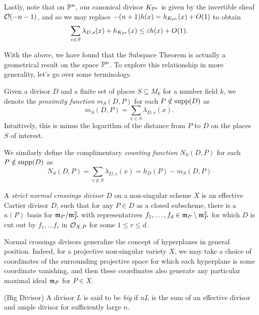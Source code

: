 Lastly, note that on $\mathbb{P}^n$,
our canonical divisor $K_{\mathbb{P}^n}$ is given by the invertible sheaf ${\mathcal{O}(-n - 1)}$, 
and so we may replace $-(n + 1)h(x) = h_{K_{\mathbb{P}^n}}(x) + O(1)$ to obtain
\[
    \sum_{v \in S} \lambda_{D,s}(x)
    + h_{K_{\mathbb{P}^n}}(x) \leq \varepsilon h(x) + O(1).
\]

With the above, 
we have found that the Subspace Theorem is actually a geometrical result on the space $\mathbb{P}^n$.
To explore this relationship in more generality,
let's go over some terminology.

\begin{definition}
    Given a divisor $D$ and a finite set of places $S \subseteq M_k$ for a number field $k$,
    we denote the \textit{proximity function} $m_S(D, P)$ for each $P \notin {\rm supp}(D)$ as
    \[
        m_S(D, P) = \sum_{v \in S} \lambda_{D,s}(x).
    \]
    Intuitively, this is minus the logarithm of the distance from $P$ to $D$ on the places $S$ of interest.

    We similarly define the complimentary \textit{counting function} $N_S(D, P)$ for each $P \notin {\rm supp}(D)$ as
    \[
        N_S(D, P)
        = \sum_{v \notin S} \lambda_{D, s}(x)
        = h_D(P) - m_S(D, P)
    \]
\end{definition}

\begin{definition}
        A \textit{strict normal crossings divisor} $D$ on a non-singular scheme $X$ is an effective Cartier divisor $D$,
        such that for any $P \in D$ as a closed subscheme,
        there is a $\kappa(P)$ basis for $\mathfrak{m}_P/\mathfrak{m}_P^2$ with representatives $f_1, \ldots, f_d \in \mathfrak{m}_P \setminus \mathfrak{m}_P^2$ for which $D$ is cut out by $f_1, \ldots f_r$ in $\mathcal{O}_{X,P}$ for some $1 \leq r \leq d$.
\end{definition}

\begin{remark}
    Normal crossings divisors generalize the concept of hyperplanes in general position.
    Indeed, for a projective non-singular variety $X$,
    we may take a choice of coordinates of the surrounding projective space for which each hyperplane is some coordinate vanishing,
    and then these coordinates also generate any particular maximal ideal $\mathfrak{m}_P$ for $P \in X$.
\end{remark}

\begin{definition}(Big Divisor)
    A divisor $L$ is said to be \textit{big} if $nL$ is the sum of an effective divisor and ample divisor for sufficiently large $n$.
\end{definition}

